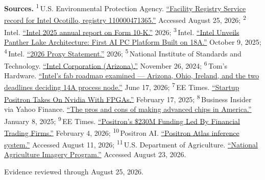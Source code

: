 \begin{minipage}[t][0.90\textheight][t]{\textwidth}
{\sffamily\scriptsize\setlength{\emergencystretch}{1.5em}\textbf{Sources.} \textsuperscript{1}\,U.S. Environmental Protection Agency. \href{\detokenize{https://ofmpub.epa.gov/frs_public2/frs_rest_services.get_facilities?registry_id=110000471365&coordinates_output=yes&program_output=yes&output=JSON}}{\enquote{Facility Registry Service record for Intel Ocotillo, registry 110000471365.}} Accessed August 25, 2026; \textsuperscript{2}\,Intel. \href{\detokenize{https://www.intc.com/filings-reports/all-sec-filings/content/0000050863-26-000011/intc-20251227.htm}}{\enquote{Intel 2025 annual report on Form 10-K.}} 2026; \textsuperscript{3}\,Intel. \href{\detokenize{https://web.archive.org/web/20260730143304/https://newsroom.intel.com/client-computing/intel-unveils-panther-lake-architecture-first-ai-pc-platform-built-on-18a}}{\enquote{Intel Unveils Panther Lake Architecture: First AI PC Platform Built on 18A.}} October 9, 2025; \textsuperscript{4}\,Intel. \href{\detokenize{https://www.intc.com/filings-reports/all-sec-filings/content/0000050863-26-000061/proxy2026.htm}}{\enquote{2026 Proxy Statement.}} 2026; \textsuperscript{5}\,National Institute of Standards and Technology. \href{\detokenize{https://www.nist.gov/chips/intel-corporation-arizona-chandler}}{\enquote{Intel Corporation (Arizona).}} November 26, 2024; \textsuperscript{6}\,Tom's Hardware. \href{\detokenize{https://www.tomshardware.com/tech-industry/semiconductors/intels-fab-roadmap-examined}}{\enquote{Intel's fab roadmap examined --- Arizona, Ohio, Ireland, and the two deadlines deciding 14A process node.}} June 17, 2026; \textsuperscript{7}\,EE Times. \href{\detokenize{https://www.eetimes.com/startup-positron-takes-on-nvidia-with-fpgas/}}{\enquote{Startup Positron Takes On Nvidia With FPGAs.}} February 17, 2025; \textsuperscript{8}\,Business Insider via Yahoo Finance. \href{\detokenize{https://finance.yahoo.com/news/pros-cons-making-advanced-chips-100002647.html}}{\enquote{The pros and cons of making advanced chips in America.}} January 8, 2025; \textsuperscript{9}\,EE Times. \href{\detokenize{https://www.eetimes.com/positron-230-million-funding-led-by-financial-trading-firms/}}{\enquote{Positron's \$230M Funding Led By Financial Trading Firms.}} February 4, 2026; \textsuperscript{10}\,Positron AI. \href{\detokenize{https://www.positron.ai/atlas}}{\enquote{Positron Atlas inference system.}} Accessed August 11, 2026; \textsuperscript{11}\,U.S. Department of Agriculture. \href{\detokenize{https://planetarycomputer.microsoft.com/dataset/naip}}{\enquote{National Agriculture Imagery Program.}} Accessed August 23, 2026.\par}
\vfill
\noindent{\color{hairline}\rule{\linewidth}{0.4pt}}\par\smallskip
{\sffamily\scriptsize\color{black!58} Evidence reviewed through August 25, 2026.\par}
\end{minipage}
